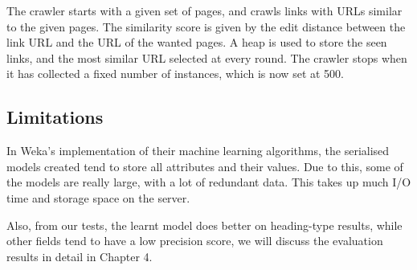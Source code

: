The crawler starts with a given set of pages, and crawls links with URLs similar to the given pages. The similarity score is given by the edit distance between the link URL and the URL of the wanted pages. A heap is used to store the seen links, and the most similar URL selected at every round. The crawler stops when it has collected a fixed number of instances, which is now set at 500.
	
\subsection{Limitations}
In Weka's implementation of their machine learning algorithms, the serialised models created tend to store all attributes and their values. Due to this, some of the models are really large, with a lot of redundant data. This takes up much I/O time and storage space on the server.

Also, from our tests, the learnt model does better on heading-type results, while other fields tend to have a low precision score, we will discuss the evaluation results in detail in Chapter 4.
	
	

